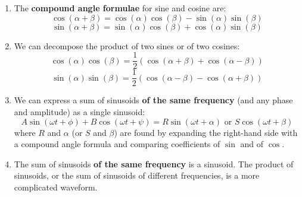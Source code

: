 \documentclass{article}
\begin{document}
\begin{enumerate}
\item The \textbf{compound angle formulae} for sine and cosine are:
	\[\cos(\alpha+\beta)=\cos(\alpha)\cos(\beta)-\sin(\alpha)\sin(\beta)\]
	\[\sin(\alpha+\beta)=\sin(\alpha)\cos(\beta)+\cos(\alpha)\sin(\beta)\]
\item We can decompose the product of two sines or of two cosines:
	\[\cos(\alpha)\cos(\beta)=\frac{1}{2}\left(\cos(\alpha+\beta)+\cos(\alpha-\beta)\right)\]
	\[\sin(\alpha)\sin(\beta) = \frac{1}{2}\left(\cos(\alpha-\beta)-\cos(\alpha+\beta)\right)\]
\item We can express a sum of sinusoids \textbf{of the same frequency} (and any phase and amplitude) as a single sinusoid:
	\[A\sin(\omega t+\phi)+B\cos(\omega t+\psi) = R\sin(\omega t+\alpha) \mbox{ or } S\cos(\omega t+\beta)\]
	where	$R$ and $\alpha$ (or $S$ and $\beta$) are found by expanding the right-hand side with a compound angle formula and comparing coefficients of $\sin$ and of $\cos$.
\item The sum of sinusoids \textbf{of the same frequency} is a sinusoid. The product of sinusoids, or the sum of sinusoids of different frequencies, is a more complicated waveform.
\end{enumerate}
\end{document}
